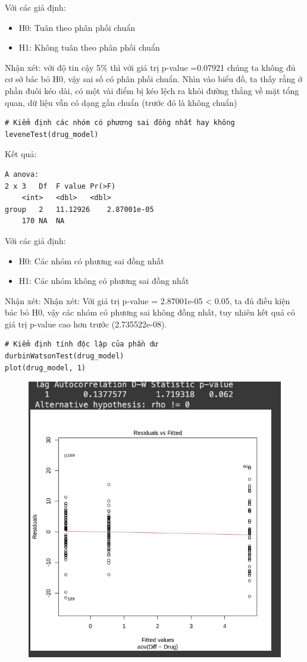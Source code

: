 \begin{itemize}
    Với các giả định:
    \begin{itemize}
        \item H0: Tuân theo phân phối chuẩn
        \item H1: Không tuân theo phân phối chuẩn
    \end{itemize}
    Nhận xét: với độ tin cậy 5\% thì với giá trị p-value =0.07921 chúng ta không đủ cơ sở bác bỏ H0, vậy sai số có phân phối chuẩn. Nhìn vào biểu đồ, ta thấy rằng ở phần đuôi kéo dài, có một vài điểm bị kéo lệch ra khỏi đường thẳng về mặt tổng quan, dữ liệu vẫn có dạng gần chuẩn (trước đó là không chuẩn)

    \begin{lstlisting}
# Kiểm định các nhóm có phương sai đồng nhất hay không
leveneTest(drug_model)
    \end{lstlisting}
    Kết quả:
    \begin{lstlisting}
A anova: 
2 x 3 	Df	F value	Pr(>F)
	<int>	<dbl>	<dbl>
group	2	11.12926	2.87001e-05
	170	NA	NA
    \end{lstlisting}
    Với các giả định:
    \begin{itemize}
        \item H0: Các nhóm có phương sai đồng nhất
        \item H1: Các nhóm không có phương sai đồng nhất
    \end{itemize}
    Nhận xét: Nhận xét: Với giá trị p-value = 2.87001e-05 < 0.05, ta đủ điều kiện bác bỏ H0, vậy các nhóm có phương sai không đồng nhất, tuy nhiên kết quả có giá trị p-value cao hơn trước (2.735522e-08).
\begin{lstlisting}
# Kiểm định tính độc lập của phần dư
durbinWatsonTest(drug_model)
plot(drug_model, 1)
\end{lstlisting}
\begin{figure}
    \centering
    \includegraphics[width=0.8\linewidth]{part01_figures/37.png}

\end{figure}
\end{itemize}
